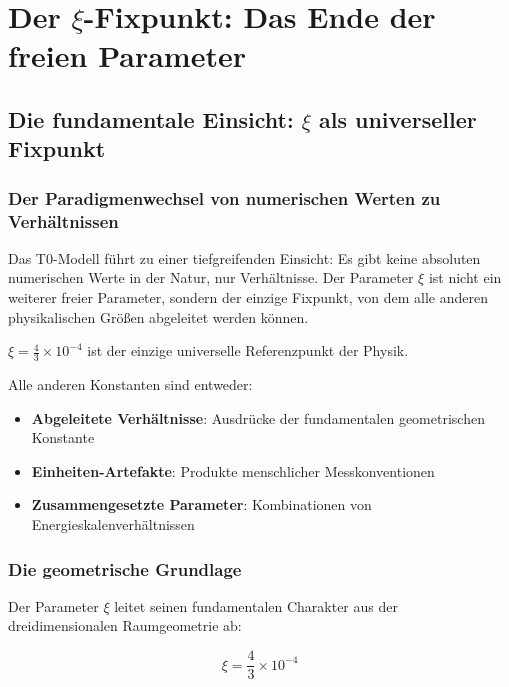 \documentclass[12pt,a4paper]{report}
\begin{document}
	\chapter{Der $\xi$-Fixpunkt: Das Ende der freien Parameter}
	\label{chap:xi_fixed_point}
	
	\section{Die fundamentale Einsicht: $\xi$ als universeller Fixpunkt}
	\label{sec:xi_universal_fixed_point}
	
	\subsection{Der Paradigmenwechsel von numerischen Werten zu Verhältnissen}
	\label{subsec:paradigm_shift_ratios}
	
	Das T0-Modell führt zu einer tiefgreifenden Einsicht: Es gibt keine absoluten numerischen Werte in der Natur, nur Verhältnisse. Der Parameter $\xi$ ist nicht ein weiterer freier Parameter, sondern der einzige Fixpunkt, von dem alle anderen physikalischen Größen abgeleitet werden können.
	
	\begin{tcolorbox}[colback=red!5!white,colframe=red!75!black,title=Fundamentale Einsicht]
		$\xi = \frac{4}{3} \times 10^{-4}$ ist der einzige universelle Referenzpunkt der Physik.
		
		Alle anderen Konstanten sind entweder:
		\begin{itemize}
			\item \textbf{Abgeleitete Verhältnisse}: Ausdrücke der fundamentalen geometrischen Konstante
			\item \textbf{Einheiten-Artefakte}: Produkte menschlicher Messkonventionen
			\item \textbf{Zusammengesetzte Parameter}: Kombinationen von Energieskalenverhältnissen
		\end{itemize}
	\end{tcolorbox}
	
	\subsection{Die geometrische Grundlage}
	\label{subsec:geometric_foundation}
	
	Der Parameter $\xi$ leitet seinen fundamentalen Charakter aus der dreidimensionalen Raumgeometrie ab:
	
	\begin{equation}
		\xi = \frac{4}{3} \times 10^{-4}
	\end{equation}
	
\end{document}
